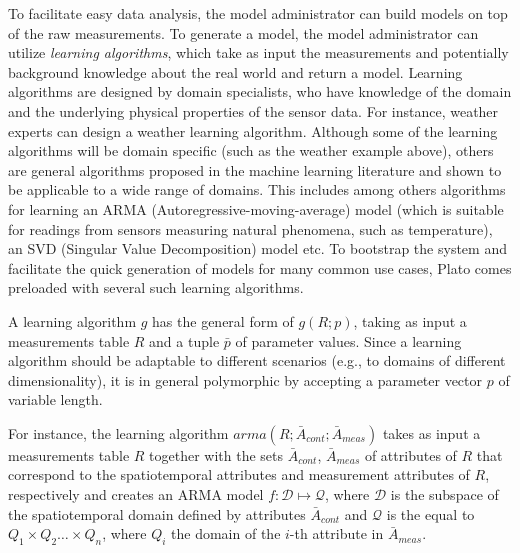 To facilitate easy data analysis, the model administrator can build models on top of the raw measurements. To generate a model, the model administrator can utilize {\em learning algorithms}, which take as input the measurements and potentially background knowledge about the real world and return a model. Learning algorithms are designed by domain specialists, who have knowledge of the domain and the underlying physical properties of the sensor data. For instance, weather experts can design a weather learning algorithm. Although some of the learning algorithms will be domain specific (such as the weather example above), others are general algorithms proposed in the machine learning literature  and shown to be applicable to a wide range of domains. This includes among others algorithms for learning an ARMA (Autoregressive-moving-average) model (which is suitable for readings from sensors measuring natural phenomena, such as temperature), an SVD (Singular Value Decomposition) model etc. To bootstrap the system and facilitate the quick generation of models for many common use cases, Plato comes preloaded with several such learning algorithms.

A learning algorithm $g$ has the general form of $g(R;p)$, taking as input a measurements table $R$ and a tuple $\bar{p}$ of parameter values. Since a learning algorithm should be adaptable to different scenarios (e.g., to domains of different dimensionality), it is in general polymorphic by accepting a parameter vector $p$ of variable length.

\vspace*{0.5cm}
\begin{example}
For instance, the learning algorithm $arma(R;{\bar{A}_{cont}}; \bar{A}_{meas})$ takes as input a measurements table $R$ together with the sets $\bar{A}_{cont}$, $\bar{A}_{meas}$ of attributes of $R$ that correspond to the spatiotemporal attributes and measurement attributes of $R$, respectively and creates an ARMA model $f:\mathcal{D}\mapsto\mathcal{Q}$, where $\mathcal{D}$ is the subspace of the spatiotemporal domain defined by attributes $\bar{A}_{cont}$ and $\mathcal{Q}$ is the equal to $Q_1 \times Q_2 \ldots \times Q_n$, where $Q_i$ the domain of the $i$-th attribute in $\bar{A}_{meas}$. 
\end{example}  
\vspace*{0.5cm}


